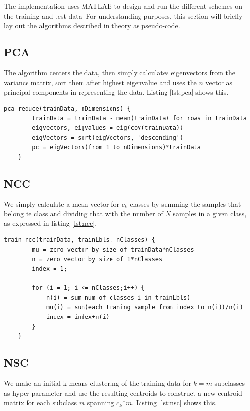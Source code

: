 \documentclass[journal]{IEEEtran}
\begin{document}
The implementation uses MATLAB to design and run the different schemes on the training and test data. For understanding purposes, this section will briefly lay out the algorithms described in theory as pseudo-code.

\subsection{PCA} 

The algorithm centers the data, then simply calculates eigenvectors from the variance matrix, sort them after highest eigenvalue and uses the $n$ vector as principal components in representing the data. Listing \ref{lst:pca} shows this.

\begin{lstlisting}[caption=Implementation of PCA., label={lst:pca}, belowskip=-0.8 \baselineskip]
	pca_reduce(trainData, nDimensions) {
		trainData = trainData - mean(trainData) for rows in trainData
		eigVectors, eigValues = eig(cov(trainData))
		eigVectors = sort(eigVectors, 'descending')
		pc = eigVectors(from 1 to nDimensions)*trainData
	}
\end{lstlisting}

\subsection{NCC} 

We simply calculate a mean vector for $c_{k}$ classes by summing the samples that belong te class and dividing that with the number of $N$ samples in a given class, as expressed in listing \ref{lst:ncc}.

\begin{lstlisting}[caption=Implementation of NCC., label={lst:ncc}]
	train_ncc(trainData, trainLbls, nClasses) {
		mu = zero vector by size of trainData*nClasses
		n = zero vector by size of 1*nClasses
		index = 1;
		
		for (i = 1; i <= nClasses;i++) {
			n(i) = sum(num of classes i in trainLbls)
			mu(i) = sum(each traning sample from index to n(i))/n(i)		
			index = index+n(i)
		}
	}
\end{lstlisting}

\subsection{NSC} 

We make an initial k-means clustering of the training data for $k=m$ subclasses as hyper parameter and use the resulting centroids to construct a new centroid matrix for each subclass $m$ spanning $c_{k}$*$m$. Listing \ref{lst:nsc} shows this.
\end{document}
